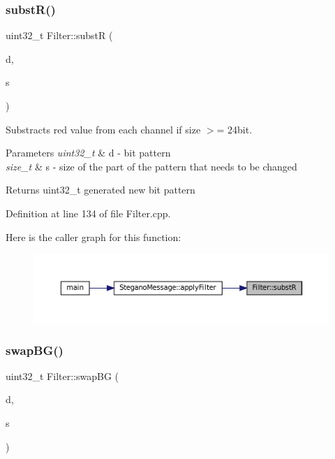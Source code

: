 \subsubsection{\texorpdfstring{substR()}{substR()}}
{\footnotesize\ttfamily uint32\+\_\+t Filter\+::substR (\begin{DoxyParamCaption}\item[{uint32\+\_\+t}]{d,  }\item[{size\+\_\+t}]{s }\end{DoxyParamCaption})\hspace{0.3cm}{\ttfamily [static]}}



Substracts red value from each channel if size $>$= 24bit. 


\begin{DoxyParams}{Parameters}
{\em uint32\+\_\+t} & d -\/ bit pattern \\
\hline
{\em size\+\_\+t} & s -\/ size of the part of the pattern that needs to be changed \\
\hline
\end{DoxyParams}
\begin{DoxyReturn}{Returns}
uint32\+\_\+t generated new bit pattern 
\end{DoxyReturn}


Definition at line 134 of file Filter.\+cpp.

Here is the caller graph for this function\+:\nopagebreak
\begin{figure}[H]
\begin{center}
\leavevmode
\includegraphics[width=350pt]{classFilter_a773ee633720080079d6a17ac610d353d_icgraph}
\end{center}
\end{figure}
\mbox{\label{classFilter_a68528a62dfbd9f78d6bd0703ca5bd828}} 
\subsubsection{\texorpdfstring{swapBG()}{swapBG()}}
{\footnotesize\ttfamily uint32\+\_\+t Filter\+::swap\+BG (\begin{DoxyParamCaption}\item[{uint32\+\_\+t}]{d,  }\item[{size\+\_\+t}]{s }\end{DoxyParamCaption})\hspace{0.3cm}{\ttfamily [static]}}



